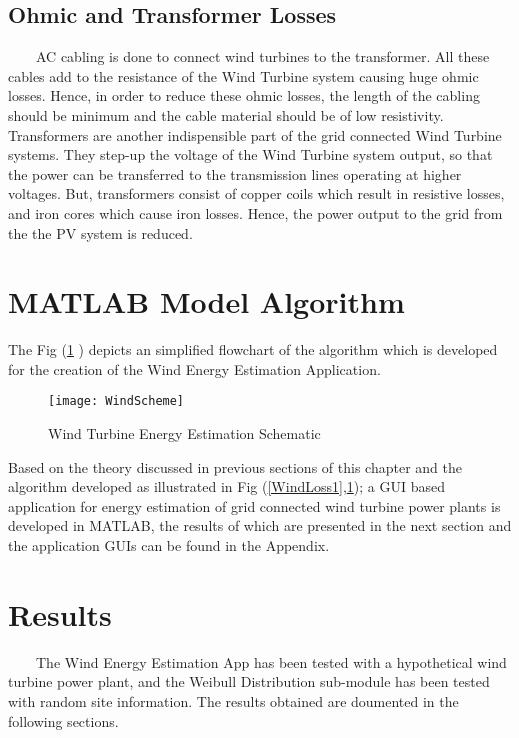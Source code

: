 \subsection{Ohmic and Transformer Losses}
\
\
\
\	
AC cabling is done to connect wind turbines to the transformer. All these cables add to the resistance of the Wind Turbine system causing huge ohmic losses. Hence, in order to reduce these ohmic losses, the length of the cabling should be minimum and the cable material should be of low resistivity.\\

Transformers are another indispensible part of the grid connected Wind Turbine systems. They step-up the voltage of the Wind Turbine system output, so that the power can be transferred to the transmission lines operating at higher voltages. But, transformers consist of copper coils which result in resistive losses, and iron cores which cause iron losses. Hence, the power output to the grid from the the PV system is reduced.\\  

\newpage
    
\section{MATLAB Model Algorithm}   

The Fig (\ref{figc5h4} ) depicts an simplified flowchart of the algorithm which is developed for the creation of the Wind Energy Estimation Application. 	      	 	
  
\begin{figure}[H]
\centering
\texttt{[image: WindScheme]}
\caption{Wind Turbine Energy Estimation Schematic}
\label{figc5h4} %
\end{figure}

Based on the theory discussed in previous sections of this chapter and the algorithm developed as illustrated in Fig (\ref{WindLoss1},\ref{figc5h4}); a GUI based application for energy estimation of grid connected wind turbine power plants is developed in MATLAB, the results of which are presented in the next section and the application GUIs can be found in the Appendix.

\newpage

\section{Results}
\
\
\
\
The Wind Energy Estimation App has been tested with a hypothetical wind turbine power plant, and the Weibull Distribution sub-module has been tested with random site information. The results obtained are doumented in the following sections.

